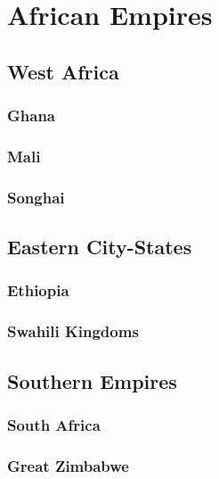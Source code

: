 \chapter{African Empires}

\section{West Africa}

\subsection*{Ghana}

\subsection*{Mali}

\subsection*{Songhai}

\section{Eastern City-States}

\subsection*{Ethiopia}

\subsection*{Swahili Kingdoms}

\section{Southern Empires}

\subsection*{South Africa}

\subsection*{Great Zimbabwe}

